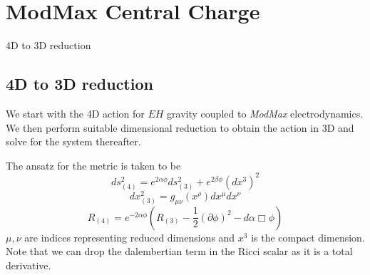 \section{ModMax Central Charge}

\begin{frame}[allowframebreaks]{4D to 3D reduction \cite{Dharewa2024}}
\subsection{4D to 3D reduction}
We start with the 4D action for $EH$ gravity coupled to \textit{ModMax} electrodynamics. We then perform suitable dimensional reduction to obtain the action in 3D and solve for the system thereafter. 

The ansatz for the metric is taken to be 
\begin{equation}
    \label{eqn:4d-3d-metric-ansatz}
    ds_{(4)}^2 = e^{2\alpha\phi}ds_{(3)}^2+e^{2\beta\phi}(dx^3)^2
\end{equation}
\begin{equation}
    dx_{(3)}^2 = g_{\mu\nu}(x^\rho)dx^\mu dx^\nu
\end{equation}
\begin{equation}
    R_{(4)} = e^{-2\alpha\phi} \left ( R_{(3)} - \frac{1}{2} (\partial\phi)^2 - d\alpha \Box\phi \right )
\end{equation}
$\mu, \nu$ are indices representing reduced dimensions and $x^3$ is the compact dimension. Note that we can drop the dalembertian term in the Ricci scalar as it is a total derivative. 


\end{frame}
